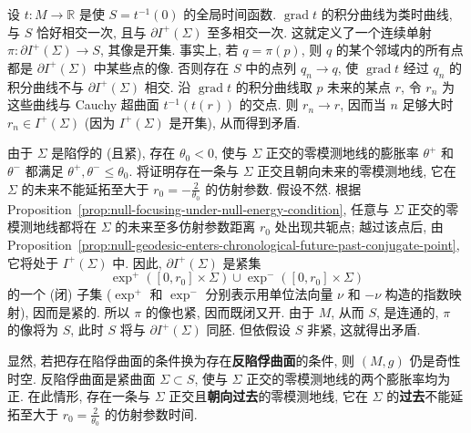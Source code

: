 \begin{RiemannProof}
设 $t:M\to\mathbb{R}$ 是使 $S=t^{-1}(0)$ 的全局时间函数. $\operatorname{grad}t$ 的积分曲线为类时曲线, 与 $S$ 恰好相交一次, 且与 $\partial I^+(\Sigma)$ 至多相交一次. 这就定义了一个连续单射 $\pi:\partial I^+(\Sigma)\to S$, 其像是开集. 事实上, 若 $q=\pi(p)$, 则 $q$ 的某个邻域内的所有点都是 $\partial I^+(\Sigma)$ 中某些点的像. 否则存在 $S$ 中的点列 $q_n\to q$, 使 $\operatorname{grad}t$ 经过 $q_n$ 的积分曲线不与 $\partial I^+(\Sigma)$ 相交. 沿 $\operatorname{grad}t$ 的积分曲线取 $p$ 未来的某点 $r$, 令 $r_n$ 为这些曲线与 Cauchy 超曲面 $t^{-1}(t(r))$ 的交点. 则 $r_n\to r$, 因而当 $n$ 足够大时 $r_n\in I^+(\Sigma)$ (因为 $I^+(\Sigma)$ 是开集), 从而得到矛盾.

由于 $\Sigma$ 是陷俘的 (且紧), 存在 $\theta_0<0$, 使与 $\Sigma$ 正交的零模测地线的膨胀率 $\theta^+$ 和 $\theta^-$ 都满足 $\theta^+,\theta^-\leq\theta_0$. 将证明存在一条与 $\Sigma$ 正交且朝向未来的零模测地线, 它在 $\Sigma$ 的未来不能延拓至大于 $r_0=-\frac{2}{\theta_0}$ 的仿射参数. 假设不然. 根据 Proposition~\ref{prop:null-focusing-under-null-energy-condition}, 任意与 $\Sigma$ 正交的零模测地线都将在 $\Sigma$ 的未来至多仿射参数距离 $r_0$ 处出现共轭点; 越过该点后, 由 Proposition~\ref{prop:null-geodesic-enters-chronological-future-past-conjugate-point}, 它将处于 $I^+(\Sigma)$ 中. 因此, $\partial I^+(\Sigma)$ 是紧集
\[
  \exp^+([0,r_0]\times\Sigma)\cup\exp^-([0,r_0]\times\Sigma)
\]
的一个 (闭) 子集 ($\exp^+$ 和 $\exp^-$ 分别表示用单位法向量 $\nu$ 和 $-\nu$ 构造的指数映射), 因而是紧的. 所以 $\pi$ 的像也紧, 因而既闭又开. 由于 $M$, 从而 $S$, 是连通的, $\pi$ 的像将为 $S$, 此时 $S$ 将与 $\partial I^+(\Sigma)$ 同胚. 但依假设 $S$ 非紧, 这就得出矛盾.
\end{RiemannProof}

\begin{RiemannRemark}\label{rem:anti-trapped-surface}
显然, 若把存在陷俘曲面的条件换为存在\textbf{反陷俘曲面}的条件, 则 $(M,g)$ 仍是奇性时空. 反陷俘曲面是紧曲面 $\Sigma\subset S$, 使与 $\Sigma$ 正交的零模测地线的两个膨胀率均为正. 在此情形, 存在一条与 $\Sigma$ 正交且\textbf{朝向过去}的零模测地线, 它在 $\Sigma$ 的\textbf{过去}不能延拓至大于 $r_0=\frac{2}{\theta_0}$ 的仿射参数时间.
\end{RiemannRemark}

